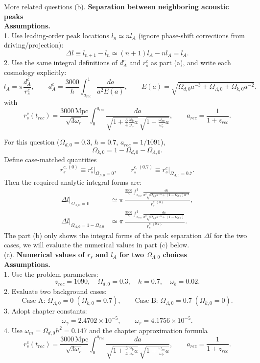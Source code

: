 \begin{example}{More related questions}{}
    (b). \textbf{Separation between neighboring acoustic peaks} \\
    \textbf{Assumptions.}\quad \\
    1. Use leading-order peak locations $l_n\simeq n l_A$ (ignore phase-shift corrections from driving/projection):
    \[
        \Delta l \equiv l_{n+1}-l_n \simeq (n+1)l_A-nl_A=l_A.
    \]
    2. Use the same integral definitions of $d_A^c$ and $r_s^c$ as part (a), and write each cosmology explicitly:
    \[
        l_A = \pi\frac{d_A^c}{r_s^c},
        \qquad
        d_A^c=\frac{3000}{h}\int_{a_{rec}}^1\frac{da}{a^2E(a)},
        \qquad
        E(a)=\sqrt{\Omega_{d,0}a^{-3}+\Omega_{\Lambda,0}+\Omega_{k,0}a^{-2}}.
    \]
    with
    \[
        r_s^c(t_{rec})=\frac{3000\,\mathrm{Mpc}}{\sqrt{3\omega_r}}
        \int_0^{a_{rec}}
        \frac{da}{\sqrt{1+\frac{3}{4}\frac{\omega_b}{\omega_\gamma}a}\,\sqrt{1+\frac{\omega_m}{\omega_r}a}},
        \qquad
        a_{rec}=\frac{1}{1+z_{rec}}.
    \]

    For this question ($\Omega_{d,0}=0.3$, $h=0.7$, $a_{rec}=1/1091$),
    \[
        \Omega_{k,0}=1-\Omega_{d,0}-\Omega_{\Lambda,0}.
    \]
    Define case-matched quantities
    \[
        r_s^{c,(0)}\equiv r_s^c\big|_{\Omega_{\Lambda,0}=0},
        \qquad
        r_s^{c,(0.7)}\equiv r_s^c\big|_{\Omega_{\Lambda,0}=0.7}.
    \]
    Then the required analytic integral forms are:
    \begin{align*}
        \Delta l\big|_{\Omega_{\Lambda,0}=0}
        &\simeq \pi\,
        \frac{\frac{3000}{h}\displaystyle\int_{a_{rec}}^1
        \frac{da}{a^2\sqrt{\Omega_{d,0}a^{-3}+(1-\Omega_{d,0})a^{-2}}}}
        {r_s^{c,(0)}}, \\
        \Delta l\big|_{\Omega_{\Lambda,0}=1-\Omega_{d,0}}
        &\simeq \pi\,
        \frac{\frac{3000}{h}\displaystyle\int_{a_{rec}}^1
        \frac{da}{a^2\sqrt{\Omega_{d,0}a^{-3}+(1-\Omega_{d,0})}}}
        {r_s^{c,(0.7)}}.
    \end{align*}
   The part (b) only shows the integral forms of the peak separation $\Delta l$ for the two cases, we will evaluate the numerical values in part (c) below. \\

   \pagebreak
    (c). \textbf{Numerical values of $r_s$ and $l_A$ for two $\Omega_{\Lambda,0}$ choices} \\
    \textbf{Assumptions.}\quad \\
    1. Use the problem parameters:
    \[
        z_{rec}=1090,\quad \Omega_{d,0}=0.3,\quad h=0.7,\quad \omega_b=0.02.
    \]
    2. Evaluate two background cases:
    \[
        \text{Case A: }\Omega_{\Lambda,0}=0\;(\Omega_{k,0}=0.7),
        \qquad
        \text{Case B: }\Omega_{\Lambda,0}=0.7\;(\Omega_{k,0}=0).
    \]
    3. Adopt chapter constants:
    \[
        \omega_\gamma=2.4702\times10^{-5},\qquad \omega_r=4.1756\times10^{-5}.
    \]
    4. Use $\omega_m=\Omega_{d,0}h^2=0.147$ and the chapter approximation formula
    \[
        r_s^c(t_{rec})=\frac{3000\,\mathrm{Mpc}}{\sqrt{3\omega_r}}
        \int_0^{a_{rec}}
        \frac{da}{\sqrt{1+\frac{3}{4}\frac{\omega_b}{\omega_\gamma}a}\,\sqrt{1+\frac{\omega_m}{\omega_r}a}},
        \qquad
        a_{rec}=\frac{1}{1+z_{rec}}.
    \]


\end{example}
